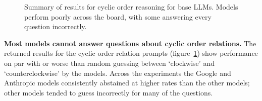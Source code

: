 \begin{figure}
    \centering
    
    \caption{Summary of results for cyclic order reasoning for base LLMs. Models perform poorly across the board, with some answering every question incorrectly.}
    \label{fig:order}
\end{figure}

\textbf{Most models cannot answer questions about cyclic order relations.}
The returned results for the cyclic order relation prompts (figure~\ref{fig:order}) show performance on par with or worse than random guessing between `clockwise' and `counterclockwise' by the models.
Across the experiments the Google and Anthropic models consistently abstained at higher rates than the other models; other models tended to guess incorrectly for many of the questions.
